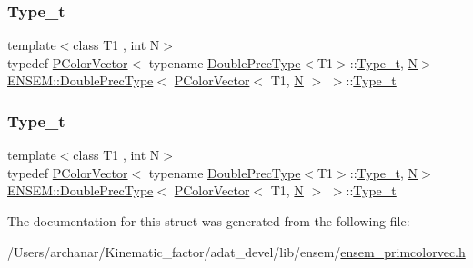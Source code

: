 \subsubsection{\texorpdfstring{Type\_t}{Type\_t}\hspace{0.1cm}{\footnotesize\ttfamily [1/2]}}
{\footnotesize\ttfamily template$<$class T1 , int N$>$ \\
typedef \mbox{\hyperlink{classENSEM_1_1PColorVector}{P\+Color\+Vector}}$<$ typename \mbox{\hyperlink{structENSEM_1_1DoublePrecType}{Double\+Prec\+Type}}$<$T1$>$\+::\mbox{\hyperlink{structENSEM_1_1DoublePrecType_3_01PColorVector_3_01T1_00_01N_01_4_01_4_af7639042ca77d3429dc5dc974ef5c87d}{Type\+\_\+t}}, \mbox{\hyperlink{operator__name__util_8cc_a7722c8ecbb62d99aee7ce68b1752f337}{N}}$>$ \mbox{\hyperlink{structENSEM_1_1DoublePrecType}{E\+N\+S\+E\+M\+::\+Double\+Prec\+Type}}$<$ \mbox{\hyperlink{classENSEM_1_1PColorVector}{P\+Color\+Vector}}$<$ T1, \mbox{\hyperlink{operator__name__util_8cc_a7722c8ecbb62d99aee7ce68b1752f337}{N}} $>$ $>$\+::\mbox{\hyperlink{structENSEM_1_1DoublePrecType_3_01PColorVector_3_01T1_00_01N_01_4_01_4_af7639042ca77d3429dc5dc974ef5c87d}{Type\+\_\+t}}}

\mbox{\label{structENSEM_1_1DoublePrecType_3_01PColorVector_3_01T1_00_01N_01_4_01_4_af7639042ca77d3429dc5dc974ef5c87d}} 
\subsubsection{\texorpdfstring{Type\_t}{Type\_t}\hspace{0.1cm}{\footnotesize\ttfamily [2/2]}}
{\footnotesize\ttfamily template$<$class T1 , int N$>$ \\
typedef \mbox{\hyperlink{classENSEM_1_1PColorVector}{P\+Color\+Vector}}$<$ typename \mbox{\hyperlink{structENSEM_1_1DoublePrecType}{Double\+Prec\+Type}}$<$T1$>$\+::\mbox{\hyperlink{structENSEM_1_1DoublePrecType_3_01PColorVector_3_01T1_00_01N_01_4_01_4_af7639042ca77d3429dc5dc974ef5c87d}{Type\+\_\+t}}, \mbox{\hyperlink{operator__name__util_8cc_a7722c8ecbb62d99aee7ce68b1752f337}{N}}$>$ \mbox{\hyperlink{structENSEM_1_1DoublePrecType}{E\+N\+S\+E\+M\+::\+Double\+Prec\+Type}}$<$ \mbox{\hyperlink{classENSEM_1_1PColorVector}{P\+Color\+Vector}}$<$ T1, \mbox{\hyperlink{operator__name__util_8cc_a7722c8ecbb62d99aee7ce68b1752f337}{N}} $>$ $>$\+::\mbox{\hyperlink{structENSEM_1_1DoublePrecType_3_01PColorVector_3_01T1_00_01N_01_4_01_4_af7639042ca77d3429dc5dc974ef5c87d}{Type\+\_\+t}}}



The documentation for this struct was generated from the following file\+:\begin{DoxyCompactItemize}
\item 
/\+Users/archanar/\+Kinematic\+\_\+factor/adat\+\_\+devel/lib/ensem/\mbox{\hyperlink{lib_2ensem_2ensem__primcolorvec_8h}{ensem\+\_\+primcolorvec.\+h}}\end{DoxyCompactItemize}
